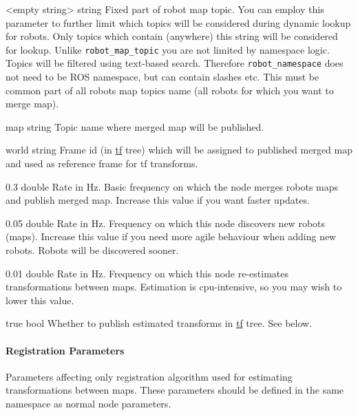 
{<empty string>}
{string}
{Fixed part of robot map topic. You can employ this parameter to further limit which topics will be considered during dynamic lookup for robots. Only topics which contain (anywhere) this string will be considered for lookup. Unlike \texttt{robot\_map\_topic} you are not limited by namespace logic. Topics will be filtered using text-based search. Therefore \texttt{robot\_namespace} does not need to be ROS namespace, but can contain slashes etc. This must be common part of all robots map topics name (all robots for which you want to merge map).}

{map}
{string}
{Topic name where merged map will be published.}

{world}
{string}
{Frame id (in \href{http://wiki.ros.org/tf}{tf} tree) which will be assigned to published merged map and used as reference frame for tf transforms.}

{0.3}
{double}
{Rate in Hz. Basic frequency on which the node merges robots maps and publish merged map. Increase this value if you want faster updates.}

{0.05}
{double}
{Rate in Hz. Frequency on which this node discovers new robots (maps). Increase this value if you need more agile behaviour when adding new robots. Robots will be discovered sooner.}

{0.01}
{double}
{Rate in Hz. Frequency on which this node re-estimates transformations between maps. Estimation is cpu-intensive, so you may wish to lower this value.}

{true}
{bool}
{Whether to publish estimated transforms in \href{http://wiki.ros.org/tf}{tf} tree. See below.}

\paragraph{Registration Parameters}
\label{sec:registration-param}

Parameters affecting only registration algorithm used for estimating transformations between maps. These parameters should be defined in the same namespace as normal node parameters.

